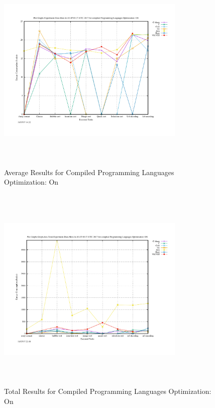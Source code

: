 \begin{figure}
	\centering
	\includegraphics[width=9cm,height=10cm,keepaspectratio]{"Graph_Experiment-Data-Mon-Jul-10-07:03:37-UTC-2017_compiled_Optimization_On"}
	\caption{Average Results for Compiled Programming Languages Optimization: On}
	\label{Compiled with Optimization Option}
\end{figure}

\begin{figure}
	\centering
	\includegraphics[width=9cm,height=10cm,keepaspectratio]{"Graph_Graph-data-Total-Experiment-Data-Mon-Jul-10-07:03:37-UTC-2017_compiled_Optimization_On"}
	\caption{Total Results for Compiled Programming Languages Optimization: On}
	\label{Compiled with Optimization Total}
\end{figure}

